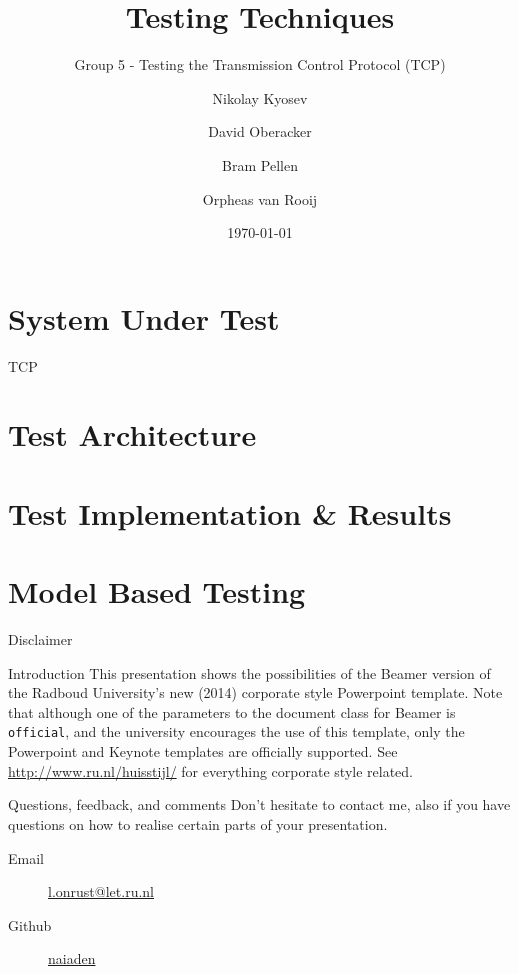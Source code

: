 \documentclass[showdate=true, slidenumbers=relative]{beamerruhuisstijl169}
\title{Testing Techniques}
\subtitle{Group 5 - Testing the Transmission Control Protocol (TCP)}
\date{\today}
\author{Nikolay Kyosev \and David Oberacker \and Bram Pellen \and Orpheas van Rooij}
\begin{document}
\begin{frame}
    \maketitle
\end{frame}

\begin{frame}
    \tableofcontents
\end{frame}

\section{System Under Test}

\begin{frame}{TCP}
    
\end{frame}

\section{Test Architecture}

\section{Test Implementation \& Results}

\section{Model Based Testing}
\appendix
\begin{frame}{Disclaimer}
    \begin{block}{Introduction}
        This presentation shows the possibilities of the Beamer version of the Radboud University's new (2014) corporate style Powerpoint template. Note that although one of the parameters to the document class for Beamer is \texttt{official}, and the university encourages the use of this template, only the Powerpoint and Keynote templates are officially supported. See \url{http://www.ru.nl/huisstijl/} for everything corporate style related.
    \end{block}

    \begin{block}{Questions, feedback, and comments}
        Don't hesitate to contact me, also if you have questions on how to realise certain parts of your presentation.
        \begin{description}
            \item[Email] \href{mailto:l.onrust@let.ru.nl}{l.onrust@let.ru.nl}
            \item[Github] \href{https://github.com/naiaden}{naiaden}
        \end{description}
    \end{block}
\end{frame}
\end{document}

